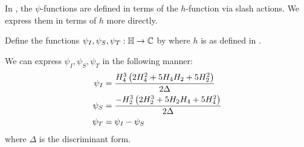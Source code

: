 In \cite{Viazovska8}, the $\psi$-functions are defined in terms of the $h$-function via slash actions. We express them in terms of $h$ more directly.

\begin{boxdefinition}\label{Ch4:Def:psis}
    Define the functions $\psi_I, \psi_S, \psi_T : \mathbb{H} \to \mathbb{C}$ by
    where $h$ is as defined in .
\end{boxdefinition}

\begin{boxproposition}\label{Ch4:Prop:psi_as_div_disc}
    We can express $\psi_I, \psi_S, \psi_T$ in the following manner:
    \begin{align}
        \psi_I &= \frac{H_4^3\left( 2 H_4^2 + 5 H_4 H_2 + 5 H_2^2 \right)}{2 \Delta}
            \label{Ch4:Eq:psi_I_def} \\
        \psi_S &= \frac{- H_2^3 \left( 2 H_2^3 + 5 H_2 H_4 + 5 H_4^2 \right)}{2 \Delta}
            \label{Ch4:Eq:psi_S_def} \\
        \psi_T &= \psi_I - \psi_S
            \label{Ch4:Eq:psi_T_def}
    \end{align}
    where $\Delta$ is the discriminant form.
\end{boxproposition}